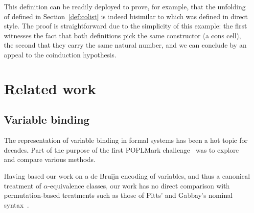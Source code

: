 {\begin{agdasnippet}
\end{agdasnippet}

This definition can be readily deployed to prove, for example, that the unfolding
of  defined in Section~\ref{def:colist} is indeed bisimilar to 
which was defined in direct style. The proof is straightforward due to the simplicity
of this example: the first  witnesses the fact that both definitions
pick the same constructor (a cons cell), the second that they carry the
same natural number, and we can conclude by an appeal to the coinduction
hypothesis.

\begin{agdasnippet}
\end{agdasnippet}





\section{Related work}\label{section:related-work}

\subsection{Variable binding} The representation of variable binding
in formal systems has been a hot topic for decades. Part of the purpose
of the first POPLMark challenge~\citeyear{poplmark} was to explore and
compare various methods.

Having based our work on a de Bruijn encoding of variables, and thus a
canonical treatment of \(\alpha\)-equivalence classes, our work has no
direct comparison with permutation-based treatments such as those of
Pitts' and Gabbay's nominal syntax~\citeyear{gabbay:newaas-jv}.

}
